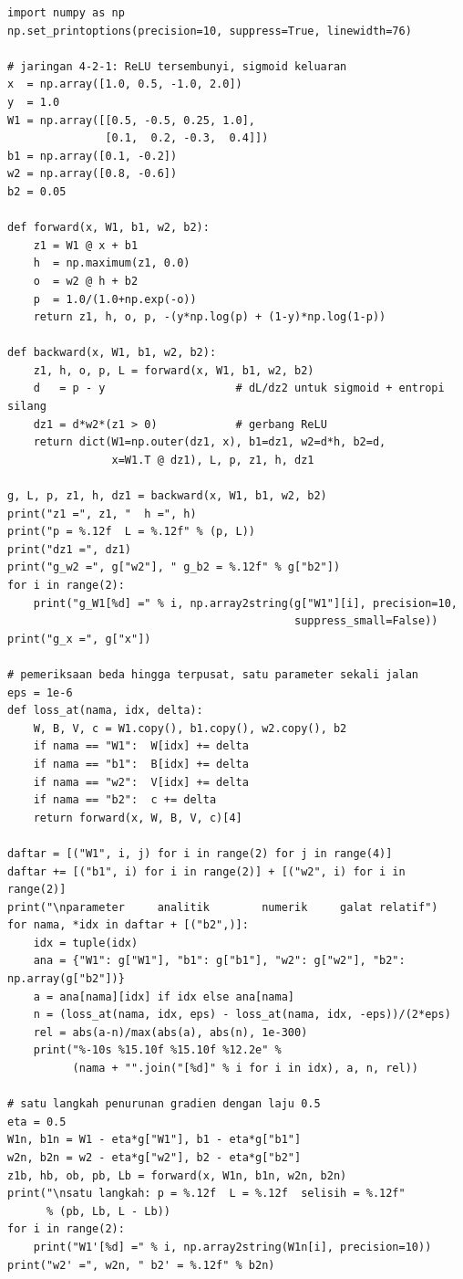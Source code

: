 \begin{lab}
\begin{verbatim}
import numpy as np
np.set_printoptions(precision=10, suppress=True, linewidth=76)

# jaringan 4-2-1: ReLU tersembunyi, sigmoid keluaran
x  = np.array([1.0, 0.5, -1.0, 2.0])
y  = 1.0
W1 = np.array([[0.5, -0.5, 0.25, 1.0],
               [0.1,  0.2, -0.3,  0.4]])
b1 = np.array([0.1, -0.2])
w2 = np.array([0.8, -0.6])
b2 = 0.05

def forward(x, W1, b1, w2, b2):
    z1 = W1 @ x + b1
    h  = np.maximum(z1, 0.0)
    o  = w2 @ h + b2
    p  = 1.0/(1.0+np.exp(-o))
    return z1, h, o, p, -(y*np.log(p) + (1-y)*np.log(1-p))

def backward(x, W1, b1, w2, b2):
    z1, h, o, p, L = forward(x, W1, b1, w2, b2)
    d   = p - y                    # dL/dz2 untuk sigmoid + entropi silang
    dz1 = d*w2*(z1 > 0)            # gerbang ReLU
    return dict(W1=np.outer(dz1, x), b1=dz1, w2=d*h, b2=d,
                x=W1.T @ dz1), L, p, z1, h, dz1

g, L, p, z1, h, dz1 = backward(x, W1, b1, w2, b2)
print("z1 =", z1, "  h =", h)
print("p = %.12f  L = %.12f" % (p, L))
print("dz1 =", dz1)
print("g_w2 =", g["w2"], " g_b2 = %.12f" % g["b2"])
for i in range(2):
    print("g_W1[%d] =" % i, np.array2string(g["W1"][i], precision=10,
                                            suppress_small=False))
print("g_x =", g["x"])

# pemeriksaan beda hingga terpusat, satu parameter sekali jalan
eps = 1e-6
def loss_at(nama, idx, delta):
    W, B, V, c = W1.copy(), b1.copy(), w2.copy(), b2
    if nama == "W1":  W[idx] += delta
    if nama == "b1":  B[idx] += delta
    if nama == "w2":  V[idx] += delta
    if nama == "b2":  c += delta
    return forward(x, W, B, V, c)[4]

daftar = [("W1", i, j) for i in range(2) for j in range(4)]
daftar += [("b1", i) for i in range(2)] + [("w2", i) for i in range(2)]
print("\nparameter     analitik        numerik     galat relatif")
for nama, *idx in daftar + [("b2",)]:
    idx = tuple(idx)
    ana = {"W1": g["W1"], "b1": g["b1"], "w2": g["w2"], "b2": np.array(g["b2"])}
    a = ana[nama][idx] if idx else ana[nama]
    n = (loss_at(nama, idx, eps) - loss_at(nama, idx, -eps))/(2*eps)
    rel = abs(a-n)/max(abs(a), abs(n), 1e-300)
    print("%-10s %15.10f %15.10f %12.2e" %
          (nama + "".join("[%d]" % i for i in idx), a, n, rel))

# satu langkah penurunan gradien dengan laju 0.5
eta = 0.5
W1n, b1n = W1 - eta*g["W1"], b1 - eta*g["b1"]
w2n, b2n = w2 - eta*g["w2"], b2 - eta*g["b2"]
z1b, hb, ob, pb, Lb = forward(x, W1n, b1n, w2n, b2n)
print("\nsatu langkah: p = %.12f  L = %.12f  selisih = %.12f"
      % (pb, Lb, L - Lb))
for i in range(2):
    print("W1'[%d] =" % i, np.array2string(W1n[i], precision=10))
print("w2' =", w2n, " b2' = %.12f" % b2n)


\end{verbatim}
\end{lab}
